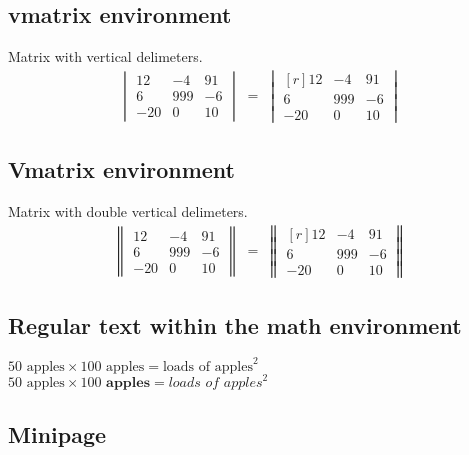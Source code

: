 \documentclass[11pt,a4paper]{report}
\theoremstyle{remark}
\theoremstyle{definition}
\begin{document}
			\subsection*{vmatrix environment}
			
				\noindent
				Matrix with vertical delimeters.
				\begin{align*}
					\begin{vmatrix}
						12 & -4 & 91
					\\
						6 & 999 & -6
					\\
						-20 & 0 & 10
					\end{vmatrix}
					\;=\;
					\begin{vmatrix*}[r]
						12 & -4 & 91
					\\
						6 & 999 & -6
					\\
						-20 & 0 & 10
					\end{vmatrix*}
				\end{align*}
			
			\subsection*{Vmatrix environment}
			
				\noindent
				Matrix with double vertical delimeters.
				\begin{align*}
					\begin{Vmatrix}
						12 & -4 & 91
					\\
						6 & 999 & -6
					\\
						-20 & 0 & 10
					\end{Vmatrix}
					\;=\;
					\begin{Vmatrix*}[r]
						12 & -4 & 91
					\\
						6 & 999 & -6
					\\
						-20 & 0 & 10
					\end{Vmatrix*}
				\end{align*}
			
			\subsection*{Regular text within the math environment}
			
				\noindent
				$50 \text{ apples} \times 100 \text{ apples} = \text{loads of apples}^2$ \\
				$50 \textrm{ apples} \times 100 \textbf{ apples} = \textit{loads of apples}^2$
				
			\subsection*{Minipage}
			
\end{document}
